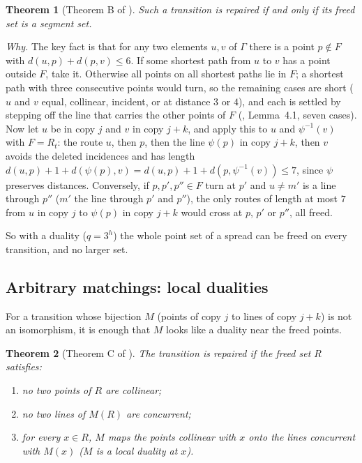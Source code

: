 \documentclass[11pt]{amsart}
\newtheorem{theorem}{Theorem}[section]
\theoremstyle{definition}
\theoremstyle{remark}
\begin{document}
\begin{theorem}[Theorem B of ]\label{thm:segment}
Such a transition is repaired if and only if its freed set is a segment set.
\end{theorem}

\emph{Why.} The key fact is that for any two elements $u,v$ of $\Gamma$ there is a point $p\notin F$ with $d(u,p)+d(p,v)\le 6$. If some shortest path from $u$ to $v$ has a point outside $F$, take it. Otherwise all points on all shortest paths lie in $F$; a shortest path with three consecutive points would turn, so the remaining cases are short ($u$ and $v$ equal, collinear, incident, or at distance $3$ or $4$), and each is settled by stepping off the line that carries the other points of $F$ (, Lemma~4.1, seven cases). Now let $u$ be in copy $j$ and $v$ in copy $j+k$, and apply this to $u$ and $\psi^{-1}(v)$ with $F=R_t$: the route $u$, then $p$, then the line $\psi(p)$ in copy $j+k$, then $v$ avoids the deleted incidences and has length $d(u,p)+1+d(\psi(p),v)=d(u,p)+1+d(p,\psi^{-1}(v))\le 7$, since $\psi$ preserves distances. Conversely, if $p,p',p''\in F$ turn at $p'$ and $u\ne m'$ is a line through $p''$ ($m'$ the line through $p'$ and $p''$), the only routes of length at most $7$ from $u$ in copy $j$ to $\psi(p)$ in copy $j+k$ would cross at $p$, $p'$ or $p''$, all freed.

So with a duality ($q=3^h$) the whole point set of a spread can be freed on every transition, and no larger set.

\subsection{Arbitrary matchings: local dualities}\label{ssec:localdual}
For a transition whose bijection $M$ (points of copy $j$ to lines of copy $j+k$) is not an isomorphism, it is enough that $M$ looks like a duality near the freed points.

\begin{theorem}[Theorem C of ]\label{thm:localdual}
The transition is repaired if the freed set $R$ satisfies:
\begin{enumerate}[label=\textup{(H\arabic*)},leftmargin=3em]
\item no two points of $R$ are collinear;
\item no two lines of $M(R)$ are concurrent;
\item for every $x\in R$, $M$ maps the points collinear with $x$ onto the lines concurrent with $M(x)$ \textup{(}$M$ is a \emph{local duality} at $x$\textup{)}.
\end{enumerate}
\end{theorem}
\end{document}
